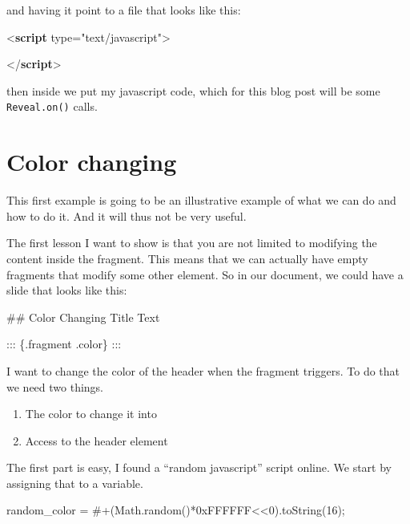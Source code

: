 \documentclass[
  letterpaper,
  DIV=11,
  numbers=noendperiod]{scrreprt}
\newenvironment{Shaded}{\begin{snugshade}}{\end{snugshade}}
\newcommand{\BaseNTok}[1]{\textcolor[rgb]{0.68,0.00,0.00}{#1}}
\newcommand{\BuiltInTok}[1]{\textcolor[rgb]{0.00,0.23,0.31}{#1}}
\newcommand{\DataTypeTok}[1]{\textcolor[rgb]{0.68,0.00,0.00}{#1}}
\newcommand{\DecValTok}[1]{\textcolor[rgb]{0.68,0.00,0.00}{#1}}
\newcommand{\FunctionTok}[1]{\textcolor[rgb]{0.28,0.35,0.67}{#1}}
\newcommand{\KeywordTok}[1]{\textcolor[rgb]{0.00,0.23,0.31}{\textbf{#1}}}
\newcommand{\NormalTok}[1]{\textcolor[rgb]{0.00,0.23,0.31}{#1}}
\newcommand{\OperatorTok}[1]{\textcolor[rgb]{0.37,0.37,0.37}{#1}}
\newcommand{\OtherTok}[1]{\textcolor[rgb]{0.00,0.23,0.31}{#1}}
\newcommand{\StringTok}[1]{\textcolor[rgb]{0.13,0.47,0.30}{#1}}
\providecommand{\tightlist}{%
  \setlength{\itemsep}{0pt}\setlength{\parskip}{0pt}}\usepackage{longtable,booktabs,array}
\begin{document}
and having it point to a file that looks like this:

\begin{Shaded}
\begin{Highlighting}[]
\DataTypeTok{\textless{}}\KeywordTok{script}\OtherTok{ type=}\StringTok{"text/javascript"}\DataTypeTok{\textgreater{}}

\DataTypeTok{\textless{}/}\KeywordTok{script}\DataTypeTok{\textgreater{}}
\end{Highlighting}
\end{Shaded}

then inside we put my javascript code, which for this blog post will be
some \texttt{Reveal.on()} calls.

\section{Color changing}\label{color-changing}

This first example is going to be an illustrative example of what we can
do and how to do it. And it will thus not be very useful.

The first lesson I want to show is that you are not limited to modifying
the content inside the fragment. This means that we can actually have
empty fragments that modify some other element. So in our document, we
could have a slide that looks like this:

\begin{Shaded}
\begin{Highlighting}[]
\FunctionTok{\#\# Color Changing Title Text}

\NormalTok{::: \{.fragment .color\}}
\NormalTok{:::}
\end{Highlighting}
\end{Shaded}

I want to change the color of the header when the fragment triggers. To
do that we need two things.

\begin{enumerate}
\def\labelenumi{\arabic{enumi}.}
\tightlist
\item
  The color to change it into
\item
  Access to the header element
\end{enumerate}

The first part is easy, I found a ``random javascript'' script online.
We start by assigning that to a variable.

\begin{Shaded}
\begin{Highlighting}[]
\NormalTok{random\_color }\OperatorTok{=} \StringTok{\textquotesingle{}\#\textquotesingle{}}\OperatorTok{+}\NormalTok{(}\BuiltInTok{Math}\OperatorTok{.}\FunctionTok{random}\NormalTok{()}\OperatorTok{*}\BaseNTok{0xFFFFFF}\OperatorTok{\textless{}\textless{}}\DecValTok{0}\NormalTok{)}\OperatorTok{.}\FunctionTok{toString}\NormalTok{(}\DecValTok{16}\NormalTok{)}\OperatorTok{;}
\end{Highlighting}
\end{Shaded}
\end{document}
